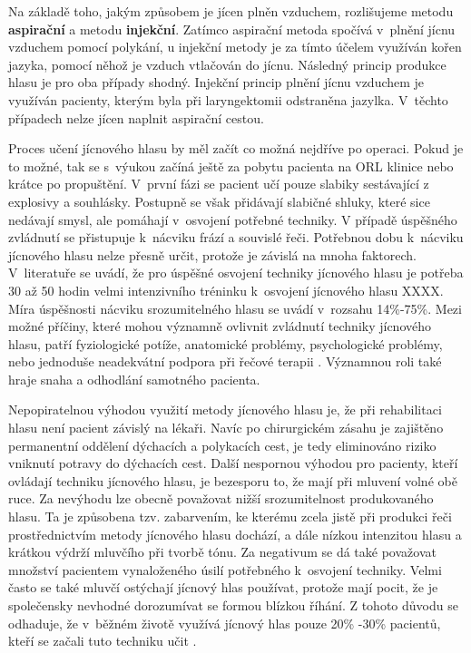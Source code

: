 Na základě toho, jakým způsobem je jícen plněn vzduchem, rozlišujeme metodu \textbf{aspirační} a metodu \textbf{injekční}. Zatímco aspirační metoda spočívá v~plnění jícnu vzduchem pomocí polykání, u injekční metody je za tímto účelem využíván kořen jazyka, pomocí něhož je vzduch vtlačován do jícnu. Následný princip produkce hlasu je pro oba případy shodný. Injekční princip plnění jícnu vzduchem je využíván pacienty, kterým byla
při laryngektomii odstraněna jazylka. V~těchto případech nelze jícen naplnit aspirační cestou.

Proces učení jícnového hlasu by měl začít co možná nejdříve po operaci. Pokud
je to možné, tak se s~výukou začíná ještě za pobytu pacienta na ORL klinice
nebo krátce po propuštění. V~první fázi se pacient učí pouze slabiky
sestávající z explosivy a souhlásky. Postupně se však přidávají slabičné
shluky, které sice nedávají smysl, ale pomáhají v~osvojení potřebné techniky.
V případě úspěšného zvládnutí se přistupuje  k~nácviku frází a souvislé řeči.
Potřebnou dobu  k~nácviku jícnového hlasu nelze přesně určit, protože je
závislá na mnoha faktorech. V~literatuře se uvádí, že pro úspěšné osvojení techniky jícnového hlasu je potřeba 30 až 50 hodin velmi intenzivního tréninku  k~osvojení jícnového hlasu XXXX. Míra úspěšnosti nácviku srozumitelného hlasu se uvádí v~rozsahu 14\%-75\%. %
Mezi možné příčiny, které mohou významně ovlivnit zvládnutí techniky jícnového hlasu, patří
fyziologické potíže, anatomické problémy, psychologické problémy, nebo jednoduše
neadekvátní podpora při řečové terapii \cite{Brown2003}. Významnou roli také
hraje snaha a odhodlání samotného pacienta.

Nepopiratelnou výhodou využití metody jícnového hlasu je, že při rehabilitaci hlasu není pacient závislý na lékaři. Navíc po chirurgickém zásahu je zajištěno permanentní oddělení dýchacích a
polykacích cest, je tedy eliminováno riziko vniknutí potravy do dýchacích cest.
Další nespornou výhodou pro pacienty, kteří ovládají techniku jícnového hlasu, je bezesporu to, že mají při mluvení
volné obě ruce. Za nevýhodu lze obecně považovat nižší srozumitelnost produkovaného hlasu.
Ta je způsobena tzv.  zabarvením, ke kterému zcela jistě při produkci řeči prostřednictvím metody jícnového hlasu  dochází, a dále nízkou intenzitou hlasu a krátkou výdrží mluvčího při tvorbě tónu. Za negativum se dá také považovat množství pacientem vynaloženého úsilí potřebného  k~osvojení
techniky. Velmi často se také mluvčí ostýchají jícnový hlas používat, protože
mají pocit, že je společensky nevhodné dorozumívat se formou blízkou říhání. Z
tohoto důvodu se odhaduje, že v~běžném životě využívá jícnový hlas pouze 20\% -30\%
pacientů, kteří se začali tuto techniku učit \cite{Hradecka2007}.

